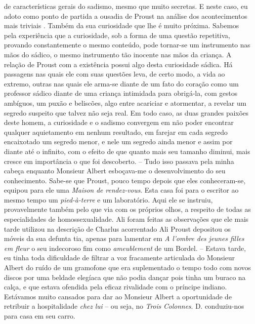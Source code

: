 de características gerais do sadismo, mesmo que muito secretas. E neste
caso, eu adoto como ponto de partida a ousadia de Proust na análise dos
acontecimentos mais triviais . Também da sua curiosidade que lhe é muito
próxima. Sabemos pela experiência que a curiosidade, sob a forma de uma
questão repetitiva, provando constantemente o mesmo conteúdo, pode
tornar-se um instrumento nas mãos do sádico, o mesmo instrumento tão
inocente nas mãos da criança. A relação de Proust com a existência
possui algo desta curiosidade sádica. Há passagens nas quais ele com
suas questões leva, de certo modo, a vida ao extremo, outras nas quais
ele arma-se diante de um fato do coração como um professor sádico diante
de uma criança intimidada para obrigá-la, com gestos ambíguos, um puxão
e beliscões, algo entre acariciar e atormentar, a revelar um segredo
suspeito que talvez não seja real. Em todo caso, as duas grandes paixões
deste homem, a curiosidade e o sadismo convergem em não poder encontrar
qualquer aquietamento em nenhum resultado, em farejar em cada segredo
encaixotado um segredo menor, e nele um segredo ainda menor e assim por
diante até o infinito, com o efeito de que quanto mais seu tamanho
diminui, mais cresce em importância o que foi descoberto. -- Tudo isso
passava pela minha cabeça enquanto Monsieur Albert esboçava-me o
desenvolvimento do seu conhecimento. Sabe-se que Proust, pouco tempo
depois que eles conheceram-se, equipou para ele uma \emph{Maison de
rendez-vous}. Esta casa foi para o escritor ao mesmo tempo um
\emph{pied-à-terre} e um laboratório. Aqui ele se instruiu,
provavelmente também pelo que via com os próprios olhos, a respeito de
todas as especialidades de homossexualidade. Ali foram feitas as
observações que ele mais tarde utilizou na descrição de Charlus
acorrentado Ali Proust depositou os móveis da sua defunta tia, apenas
para lamentar em \emph{A l'ombre des jeunes filles em fleur} o seu
indecoroso fim como \emph{ameublement} de um Bordel. -- Estava tarde, eu
tinha toda dificuldade de filtrar a voz fracamente articulada do
Monsieur Albert do ruído de um gramofone que era suplementado o tempo
todo com novos discos por uma beldade elegíaca que não podia dançar pois
tinha um buraco na calça, e que estava ofendida pela eficaz rivalidade
com o príncipe indiano. Estávamos muito cansados para dar ao Monsieur
Albert a oportunidade de retribuir a hospitalidade \emph{chez lui} -- ou
seja, no \emph{Trois Colonnes}. D. conduziu-nos para casa em seu carro.

